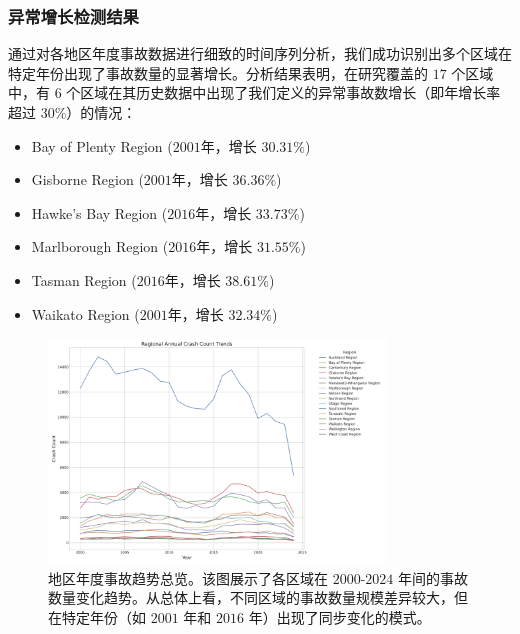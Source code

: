 \documentclass[12pt,a4paper]{article}
\begin{document}
\subsubsection{异常增长检测结果}

通过对各地区年度事故数据进行细致的时间序列分析，我们成功识别出多个区域在特定年份出现了事故数量的显著增长。分析结果表明，在研究覆盖的 $17$ 个区域中，有 $6$ 个区域在其历史数据中出现了我们定义的异常事故数增长（即年增长率超过 $30\%$）的情况：

\begin{itemize}
\item Bay of Plenty Region ($2001$年，增长 $30.31\%$)
\item Gisborne Region ($2001$年，增长 $36.36\%$)
\item Hawke's Bay Region ($2016$年，增长 $33.73\%$)
\item Marlborough Region ($2016$年，增长 $31.55\%$)
\item Tasman Region ($2016$年，增长 $38.61\%$)
\item Waikato Region ($2001$年，增长 $32.34\%$)
\end{itemize}

\begin{figure}[H]
\centering
\includegraphics[width=0.8\textwidth]{region_year_trends.png}
\caption{地区年度事故趋势总览。该图展示了各区域在 $2000$-$2024$ 年间的事故数量变化趋势。从总体上看，不同区域的事故数量规模差异较大，但在特定年份（如 $2001$ 年和 $2016$ 年）出现了同步变化的模式。}
\label{fig:region_year_trends}
\end{figure}
\end{document}
